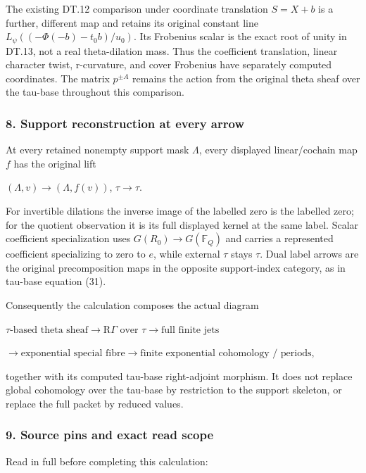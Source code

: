 The existing DT.12 comparison under coordinate translation \(S=X+b\) is a further, different map and retains its original constant line \(L_\psi((-\Phi(-b)-t_0b)/u_0)\). Its Frobenius scalar is the exact root of unity in DT.13, not a real theta-dilation mass. Thus the coefficient translation, linear character twist, r-curvature, and cover Frobenius have separately computed coordinates. The matrix \(p^{\pm A}\) remains the action from the original theta sheaf over the tau-base throughout this comparison.

\subsubsection{8. Support reconstruction at every arrow}\label{endpoint-f1_scaling--support-reconstruction-at-every-arrow}

At every retained nonempty support mask \(\Lambda\), every displayed linear/cochain map \(f\) has the original lift

\((\Lambda,v)\to (\Lambda,f(v))\), \(\tau\to \tau\).

For invertible dilations the inverse image of the labelled zero is the labelled zero; for the quotient observation it is its full displayed kernel at the same label. Scalar coefficient specialization uses \(G(R_0)\to G(\mathbb F_Q)\) and carries a represented coefficient specializing to zero to \(e\), while external \(\tau\) stays \(\tau\). Dual label arrows are the original precomposition maps in the opposite support-index category, as in tau-base equation (31).

Consequently the calculation composes the actual diagram

\(\tau\text{-based theta sheaf}\to\mathrm R\Gamma\text{ over }\tau\to\text{full finite jets}\)

\(\to\text{exponential special fibre}\to\text{finite exponential cohomology / periods}\),

together with its computed tau-base right-adjoint morphism. It does not replace global cohomology over the tau-base by restriction to the support skeleton, or replace the full packet by reduced values.

\subsubsection{9. Source pins and exact read scope}\label{endpoint-f1_scaling--source-pins-and-exact-read-scope}

Read in full before completing this calculation:

